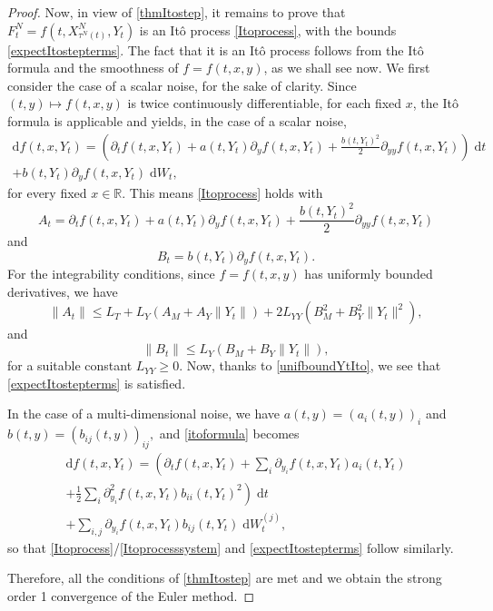 \documentclass[reqno,12pt]{amsart}
\theoremstyle{plain} %
\theoremstyle{definition} %
\begin{document}
\begin{proof}
    Now, in view of \cref{thmItostep}, it remains to prove that $F_t^N = f(t, X_{\tau^N(t)}^N, Y_t)$ is an It\^o process \eqref{Itoprocess}, with the bounds \eqref{expectItostepterms}. The fact that it is an It\^o process follows from the It\^o formula and the smoothness of $f=f(t, x, y)$, as we shall see now. We first consider the case of a scalar noise, for the sake of clarity. Since $(t, y) \mapsto f(t, x, y)$ is twice continuously differentiable, for each fixed $x$, the It\^o formula is applicable and yields, in the case of a scalar noise,
    \begin{multline}
        \label{itoformula}
        \mathrm{d}f(t, x, Y_t) = \left(\partial_t f(t, x, Y_t) + a(t, Y_t) \partial_y f(t, x, Y_t)  + \frac{b(t, Y_t)^2}{2}\partial_{yy}f(t, x, Y_t) \right) \;\mathrm{d}t \\ + b(t, Y_t) \partial_y f(t, x, Y_t)\;\mathrm{d}W_t,
    \end{multline}
    for every fixed $x\in \mathbb{R}$. This means \eqref{Itoprocess} holds with
    \[
        A_t = \partial_t f(t, x, Y_t) + a(t, Y_t) \partial_y f(t, x, Y_t)  + \frac{b(t, Y_t)^2}{2}\partial_{yy}f(t, x, Y_t)
    \]
    and
    \[
        B_t = b(t, Y_t) \partial_y f(t, x, Y_t).
    \]
    For the integrability conditions, since $f=f(t, x, y)$ has uniformly bounded derivatives, we have
    \[
        \|A_t\| \leq L_T + L_Y(A_M + A_Y\|Y_t\|) + 2L_{YY}(B_M^2 + B_Y^2\|Y_t\|^2),
    \]
    and
    \[
        \|B_t\| \leq L_Y (B_M + B_Y \|Y_t\|),
    \]
    for a suitable constant $L_{YY}\geq 0$. Now, thanks to \eqref{unifboundYtIto}, we see that \eqref{expectItostepterms} is satisfied.

    In the case of a multi-dimensional noise, we have $a(t, y) = (a_i(t, y))_i$ and $b(t, y) = (b_{ij}(t, y))_{ij},$ and \eqref{itoformula} becomes
    \begin{multline}
        \label{itoformulamulti}
        \mathrm{d}f(t, x, Y_t) = \left(\partial_t f(t, x, Y_t) + \sum_i \partial_{y_i} f(t, x, Y_t) a_i(t, Y_t) \right. \\
        \left. + \frac{1}{2}\sum_i \partial_{y_i}^2 f(t, x, Y_t)b_{ii}(t, Y_t)^2 \right) \;\mathrm{d}t \\ + \sum_{i,j}\partial_{y_i} f(t, x, Y_t) b_{ij}(t, Y_t) \;\mathrm{d}W_t^{(j)},
    \end{multline}
    so that \eqref{Itoprocess}/\eqref{Itoprocesssystem} and \eqref{expectItostepterms} follow similarly.

    Therefore, all the conditions of \cref{thmItostep} are met and we obtain the strong order 1 convergence of the Euler method.
\end{proof}
\end{document}
